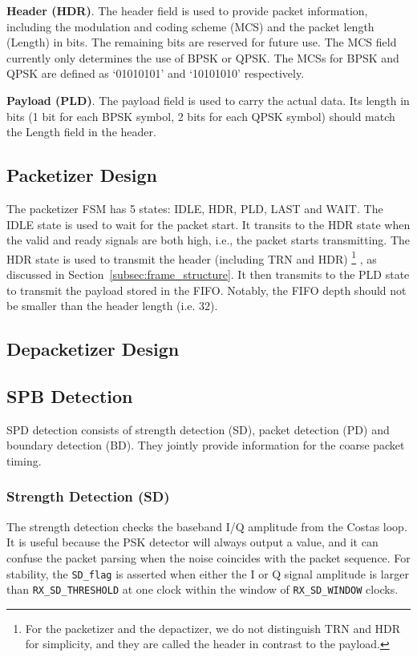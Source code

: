 \documentclass[journal,twoside]{IEEEtran}
\begin{document}
    \textbf{Header (HDR)}.
    The header field is used to provide packet information,
    including the modulation and coding scheme (MCS) and the packet length (Length) in bits.
    The remaining bits are reserved for future use.
    The MCS field currently only determines the use of BPSK or QPSK.
    The MCSs for BPSK and QPSK are defined as `01010101' and `10101010' respectively.

    \textbf{Payload (PLD)}.
    The payload field is used to carry the actual data.
    Its length in bits (1 bit for each BPSK symbol, 2 bits for each QPSK symbol) should match the Length field in the header.

    \subsection{Packetizer Design}

      The packetizer FSM has 5 states: IDLE, HDR, PLD, LAST and WAIT.
      The IDLE state is used to wait for the packet start.
      It transits to the HDR state when the valid and ready signals are both high,
      i.e., the packet starts transmitting.
      The HDR state is used to transmit the header (including TRN and HDR)%
      \footnote{For the packetizer and the depactizer, we do not distinguish TRN and HDR for simplicity,
      and they are called the header in contrast to the payload.}%
      , as discussed in Section~\ref{subsec:frame_structure}.
      It then transmits to the PLD state to transmit the payload stored in the FIFO.
      Notably, the FIFO depth should not be smaller than the header length (i.e. $32$).

    \subsection{Depacketizer Design}

    \subsection{SPB Detection}

      SPD detection consists of strength detection (SD),
      packet detection (PD) and boundary detection (BD).
      They jointly provide information for the coarse packet timing.

      \subsubsection{Strength Detection (SD)}
      The strength detection checks the baseband I/Q amplitude from the Costas loop.
      It is useful because the PSK detector will always output a value,
      and it can confuse the packet parsing when the noise coincides with the packet sequence.
      For stability, the \texttt{SD\_flag} is asserted when
      either the I or Q signal amplitude is larger than \texttt{RX\_SD\_THRESHOLD}
      at one clock within the window of \texttt{RX\_SD\_WINDOW} clocks.
\end{document}
